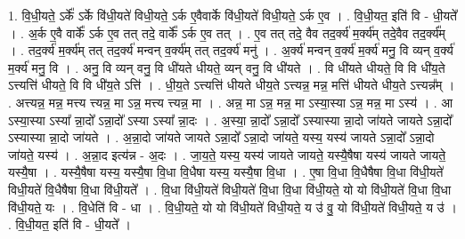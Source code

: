 \documentclass[17pt]{extarticle}
\begin{document}
1. वि॒धी॒यते॒ ऽर्के᳚ ऽर्के वि॑धी॒यते॑ विधी॒यते॒ ऽर्क ए॒वैवार्के वि॑धी॒यते॑ विधी॒यते॒ ऽर्क ए॒व । . वि॒धी॒यत॒ इति॑ वि - धी॒यते᳚ । . अ॒र्क ए॒वै वार्के᳚ ऽर्क ए॒व तत् तदे॒ वार्के᳚ ऽर्क ए॒व तत् । . ए॒व तत् तदे॒ वैव तद॒र्क्य॑ म॒र्क्य॑म् तदे॒वैव तद॒र्क्य᳚म् । . तद॒र्क्य॑ म॒र्क्य॑म् तत् तद॒र्क्य॑ मन्वन् व॒र्क्य॑म् तत् तद॒र्क्य॑ मनु॑ । . अ॒र्क्य॑ मन्वन् व॒र्क्य॑ म॒र्क्य॑ मनु॒ वि व्यन् व॒र्क्य॑ म॒र्क्य॑ मनु॒ वि । . अनु॒ वि व्यन् वनु॒ वि धी॑यते धीयते॒ व्यन् वनु॒ वि धी॑यते । . वि धी॑यते धीयते॒ वि वि धी॑य॒ते ऽत्त्यत्ति॑ धीयते॒ वि वि धी॑य॒ते ऽत्ति॑ । . धी॒य॒ते ऽत्त्यत्ति॑ धीयते धीय॒ते ऽत्त्यन्न॒ मन्न॒ मत्ति॑ धीयते धीय॒ते ऽत्त्यन्न᳚म् । . अत्त्यन्न॒ मन्न॒ मत्त्य त्त्यन्न॒ मा ऽन्न॒ मत्त्य त्त्यन्न॒ मा । . अन्न॒ मा ऽन्न॒ मन्न॒ मा ऽस्या॒स्या ऽन्न॒ मन्न॒ मा ऽस्य॑ । . आ ऽस्या॒स्या ऽस्या᳚ न्ना॒दो᳚ ऽन्ना॒दो᳚ ऽस्या ऽस्या᳚ न्ना॒दः । . अ॒स्या॒ न्ना॒दो᳚ ऽन्ना॒दो᳚ ऽस्यास्या न्ना॒दो जा॑यते जायते ऽन्ना॒दो᳚ ऽस्यास्या न्ना॒दो जा॑यते । . अ॒न्ना॒दो जा॑यते जायते ऽन्ना॒दो᳚ ऽन्ना॒दो जा॑यते॒ यस्य॒ यस्य॑ जायते ऽन्ना॒दो᳚ ऽन्ना॒दो जा॑यते॒ यस्य॑ । . अ॒न्ना॒द इत्य॑न्न - अ॒दः । . जा॒य॒ते॒ यस्य॒ यस्य॑ जायते जायते॒ यस्यै॒षैषा यस्य॑ जायते जायते॒ यस्यै॒षा । . यस्यै॒षैषा यस्य॒ यस्यै॒षा वि॒धा वि॒धैषा यस्य॒ यस्यै॒षा वि॒धा । . ए॒षा वि॒धा वि॒धैषैषा वि॒धा वि॑धी॒यते॑ विधी॒यते॑ वि॒धैषैषा वि॒धा वि॑धी॒यते᳚ । . वि॒धा वि॑धी॒यते॑ विधी॒यते॑ वि॒धा वि॒धा वि॑धी॒यते॒ यो यो वि॑धी॒यते॑ वि॒धा वि॒धा वि॑धी॒यते॒ यः । . वि॒धेति॑ वि - धा । . वि॒धी॒यते॒ यो यो वि॑धी॒यते॑ विधी॒यते॒ य उ॑ वु॒ यो वि॑धी॒यते॑ विधी॒यते॒ य उ॑ । . वि॒धी॒यत॒ इति॑ वि - धी॒यते᳚ । \newline
\end{document}
